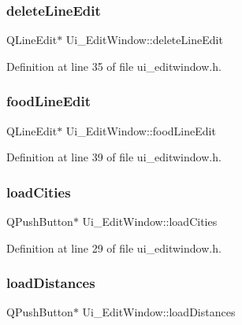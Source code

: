 \subsubsection{\texorpdfstring{deleteLineEdit}{deleteLineEdit}}
{\footnotesize\ttfamily Q\+Line\+Edit$\ast$ Ui\+\_\+\+Edit\+Window\+::delete\+Line\+Edit}



Definition at line 35 of file ui\+\_\+editwindow.\+h.

\mbox{\label{class_ui___edit_window_a91f59d2a7596e50d39d77156600390f8}} 
\subsubsection{\texorpdfstring{foodLineEdit}{foodLineEdit}}
{\footnotesize\ttfamily Q\+Line\+Edit$\ast$ Ui\+\_\+\+Edit\+Window\+::food\+Line\+Edit}



Definition at line 39 of file ui\+\_\+editwindow.\+h.

\mbox{\label{class_ui___edit_window_a72e481aba83e14845f40aea1fc15907d}} 
\subsubsection{\texorpdfstring{loadCities}{loadCities}}
{\footnotesize\ttfamily Q\+Push\+Button$\ast$ Ui\+\_\+\+Edit\+Window\+::load\+Cities}



Definition at line 29 of file ui\+\_\+editwindow.\+h.

\mbox{\label{class_ui___edit_window_a7964ea67dfb4854ce61aa3ab4455163b}} 
\subsubsection{\texorpdfstring{loadDistances}{loadDistances}}
{\footnotesize\ttfamily Q\+Push\+Button$\ast$ Ui\+\_\+\+Edit\+Window\+::load\+Distances}




